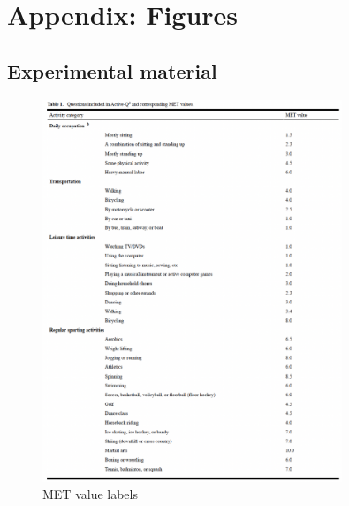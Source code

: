 \chapter*{Appendix: Figures}
\section*{Experimental material}
\begin{figure}[ht]
    \centering
    \includegraphics[width=0.8\textwidth]{appendix/met_values.png}
    \caption{MET value labels \parencite{Bonn_2012}}
    \label{fig: met_values}
\end{figure}
